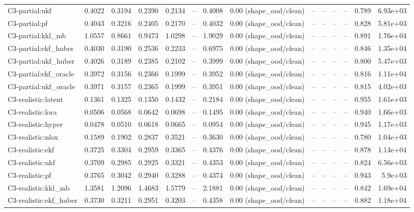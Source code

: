 \begin{table}[t]
\begin{tabular}{lrrrrrrrrrrrrr}
C3-partial:ukf & 0.4022 & 0.3194 & 0.2390 & 0.2134 & – & 0.4008 & 0.00 (shape\_ood/clean) & – & – & – & – & 0.789 & 6.93e+03 \\
C3-partial:pf & 0.4043 & 0.3216 & 0.2405 & 0.2170 & – & 0.4032 & 0.00 (shape\_ood/clean) & – & – & – & – & 0.828 & 5.81e+03 \\
C3-partial:kkl\_mb & 1.0557 & 0.8661 & 0.9473 & 1.0298 & – & 1.9029 & 0.00 (shape\_ood/clean) & – & – & – & – & 0.891 & 1.76e+04 \\
C3-partial:ekf\_huber & 0.4030 & 0.3190 & 0.2536 & 0.2233 & – & 0.6975 & 0.00 (shape\_ood/clean) & – & – & – & – & 0.846 & 1.35e+04 \\
C3-partial:ukf\_huber & 0.4026 & 0.3189 & 0.2385 & 0.2102 & – & 0.3999 & 0.00 (shape\_ood/clean) & – & – & – & – & 0.800 & 5.47e+03 \\
C3-partial:ekf\_oracle & 0.3972 & 0.3156 & 0.2366 & 0.1999 & – & 0.3952 & 0.00 (shape\_ood/clean) & – & – & – & – & 0.816 & 1.11e+04 \\
C3-partial:ukf\_oracle & 0.3971 & 0.3157 & 0.2365 & 0.1999 & – & 0.3951 & 0.00 (shape\_ood/clean) & – & – & – & – & 0.815 & 4.02e+03 \\
C3-realistic:latent & 0.1361 & 0.1325 & 0.1350 & 0.1432 & – & 0.2184 & 0.00 (shape\_ood/clean) & – & – & – & – & 0.955 & 1.61e+03 \\
C3-realistic:lora & 0.0506 & 0.0568 & 0.0642 & 0.0698 & – & 0.1495 & 0.00 (shape\_ood/clean) & – & – & – & – & 0.940 & 1.66e+03 \\
C3-realistic:hyper & 0.0478 & 0.0510 & 0.0618 & 0.0665 & – & 0.0954 & 0.00 (shape\_ood/clean) & – & – & – & – & 0.945 & 1.17e+03 \\
C3-realistic:nlox & 0.1589 & 0.1902 & 0.2837 & 0.3521 & – & 0.3630 & 0.00 (shape\_ood/clean) & – & – & – & – & 0.780 & 1.04e+03 \\
C3-realistic:ekf & 0.3725 & 0.3304 & 0.2959 & 0.3365 & – & 0.4376 & 0.00 (shape\_ood/clean) & – & – & – & – & 0.878 & 1.14e+04 \\
C3-realistic:ukf & 0.3709 & 0.2985 & 0.2925 & 0.3321 & – & 0.4353 & 0.00 (shape\_ood/clean) & – & – & – & – & 0.824 & 6.56e+03 \\
C3-realistic:pf & 0.3765 & 0.3042 & 0.2940 & 0.3288 & – & 0.4374 & 0.00 (shape\_ood/clean) & – & – & – & – & 0.943 & 5.9e+03 \\
C3-realistic:kkl\_mb & 1.3581 & 1.2096 & 1.4683 & 1.5779 & – & 2.1881 & 0.00 (shape\_ood/clean) & – & – & – & – & 0.842 & 1.69e+04 \\
C3-realistic:ekf\_huber & 0.3730 & 0.3211 & 0.2951 & 0.3203 & – & 0.4358 & 0.00 (shape\_ood/clean) & – & – & – & – & 0.882 & 1.18e+04 \\

\end{tabular}
\end{table}
